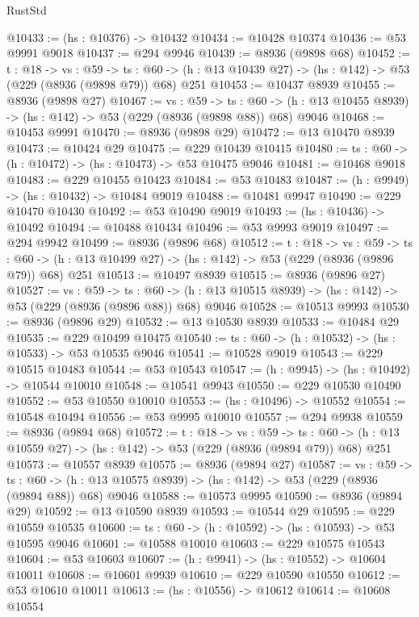 \begin{lexlean}{RustStd}
\begin{coremodule}
@10433 := (hs : @10376) -> @10432
@10434 := @10428 @10374
@10436 := @53 @9991 @9018
@10437 := @294 @9946
@10439 := @8936 (@9898 @68)
@10452 := {t : @18} ->
  {vs : @59} ->
  {ts : @60} -> (h : @13 @10439 @27) -> (hs : @142) -> @53 (@229 (@8936 (@9898 @79)) @68) @251
@10453 := @10437 @8939
@10455 := @8936 (@9898 @27)
@10467 := {vs : @59} ->
  {ts : @60} -> (h : @13 @10455 @8939) -> (hs : @142) -> @53 (@229 (@8936 (@9898 @88)) @68) @9046
@10468 := @10453 @9991
@10470 := @8936 (@9898 @29)
@10472 := @13 @10470 @8939
@10473 := @10424 @29
@10475 := @229 @10439 @10415
@10480 := {ts : @60} -> (h : @10472) -> (hs : @10473) -> @53 @10475 @9046
@10481 := @10468 @9018
@10483 := @229 @10455 @10423
@10484 := @53 @10483
@10487 := (h : @9949) -> (hs : @10432) -> @10484 @9019
@10488 := @10481 @9947
@10490 := @229 @10470 @10430
@10492 := @53 @10490 @9019
@10493 := (hs : @10436) -> @10492
@10494 := @10488 @10434
@10496 := @53 @9993 @9019
@10497 := @294 @9942
@10499 := @8936 (@9896 @68)
@10512 := {t : @18} ->
  {vs : @59} ->
  {ts : @60} -> (h : @13 @10499 @27) -> (hs : @142) -> @53 (@229 (@8936 (@9896 @79)) @68) @251
@10513 := @10497 @8939
@10515 := @8936 (@9896 @27)
@10527 := {vs : @59} ->
  {ts : @60} -> (h : @13 @10515 @8939) -> (hs : @142) -> @53 (@229 (@8936 (@9896 @88)) @68) @9046
@10528 := @10513 @9993
@10530 := @8936 (@9896 @29)
@10532 := @13 @10530 @8939
@10533 := @10484 @29
@10535 := @229 @10499 @10475
@10540 := {ts : @60} -> (h : @10532) -> (hs : @10533) -> @53 @10535 @9046
@10541 := @10528 @9019
@10543 := @229 @10515 @10483
@10544 := @53 @10543
@10547 := (h : @9945) -> (hs : @10492) -> @10544 @10010
@10548 := @10541 @9943
@10550 := @229 @10530 @10490
@10552 := @53 @10550 @10010
@10553 := (hs : @10496) -> @10552
@10554 := @10548 @10494
@10556 := @53 @9995 @10010
@10557 := @294 @9938
@10559 := @8936 (@9894 @68)
@10572 := {t : @18} ->
  {vs : @59} ->
  {ts : @60} -> (h : @13 @10559 @27) -> (hs : @142) -> @53 (@229 (@8936 (@9894 @79)) @68) @251
@10573 := @10557 @8939
@10575 := @8936 (@9894 @27)
@10587 := {vs : @59} ->
  {ts : @60} -> (h : @13 @10575 @8939) -> (hs : @142) -> @53 (@229 (@8936 (@9894 @88)) @68) @9046
@10588 := @10573 @9995
@10590 := @8936 (@9894 @29)
@10592 := @13 @10590 @8939
@10593 := @10544 @29
@10595 := @229 @10559 @10535
@10600 := {ts : @60} -> (h : @10592) -> (hs : @10593) -> @53 @10595 @9046
@10601 := @10588 @10010
@10603 := @229 @10575 @10543
@10604 := @53 @10603
@10607 := (h : @9941) -> (hs : @10552) -> @10604 @10011
@10608 := @10601 @9939
@10610 := @229 @10590 @10550
@10612 := @53 @10610 @10011
@10613 := (hs : @10556) -> @10612
@10614 := @10608 @10554

\end{coremodule}
\end{lexlean}
